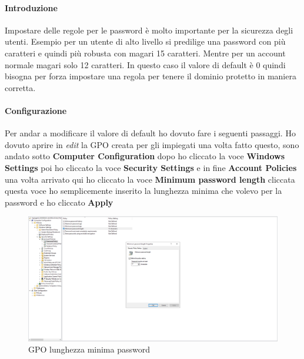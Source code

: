 \documentclass[../main.tex]{subfiles}
\begin{document}
\paragraph{Introduzione}
Impostare delle regole per le password è molto importante per la sicurezza degli utenti. Esempio per un utente di alto livello si predilige una password con più caratteri e quindi più robusta con magari 15 caratteri. Mentre per un account normale magari solo 12 caratteri. In questo caso il valore di default è 0 quindi bisogna per forza impostare una regola per tenere il dominio protetto in maniera corretta.

\paragraph{Configurazione}
Per andar a modificare il valore di default ho dovuto fare i seguenti passaggi. Ho dovuto aprire in \textit{edit} la GPO creata per gli impiegati una volta fatto questo, sono andato sotto \textbf{Computer Configuration} dopo ho cliccato la voce \textbf{Windows Settings} poi ho cliccato la voce \textbf{Security Settings} e in fine \textbf{Account Policies} una volta arrivato qui ho cliccato la voce \textbf{Minimum password length} cliccata questa voce ho semplicemente inserito la lunghezza minima che volevo per la password e ho cliccato \textbf{Apply}


\begin{figure}[h]
    \centering
    \includegraphics[width=1\textwidth]{Images/Password.png}
    \caption{GPO lunghezza minima password}
\end{figure}
\end{document}
